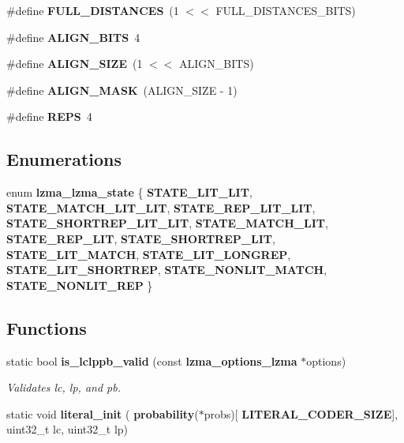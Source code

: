 \begin{DoxyCompactItemize}
\#define {\bfseries F\+U\+L\+L\+\_\+\+D\+I\+S\+T\+A\+N\+C\+ES}~(1 $<$$<$ F\+U\+L\+L\+\_\+\+D\+I\+S\+T\+A\+N\+C\+E\+S\+\_\+\+B\+I\+TS)
\item 
\mbox{\label{lzma__common_8h_a2ae9aed5395d2113810e0c5067064605}} 
\#define {\bfseries A\+L\+I\+G\+N\+\_\+\+B\+I\+TS}~4
\item 
\mbox{\label{lzma__common_8h_a65d1ea18e1cbfa27d9d1952f05e31e60}} 
\#define {\bfseries A\+L\+I\+G\+N\+\_\+\+S\+I\+ZE}~(1 $<$$<$ A\+L\+I\+G\+N\+\_\+\+B\+I\+TS)
\item 
\mbox{\label{lzma__common_8h_a9acfa53ba535d32d76682f5d3e893c05}} 
\#define {\bfseries A\+L\+I\+G\+N\+\_\+\+M\+A\+SK}~(A\+L\+I\+G\+N\+\_\+\+S\+I\+ZE -\/ 1)
\item 
\mbox{\label{lzma__common_8h_a28973becc878febad71571123f7df2c9}} 
\#define {\bfseries R\+E\+PS}~4
\end{DoxyCompactItemize}
\subsection*{Enumerations}
\begin{DoxyCompactItemize}
\item 
enum \textbf{ lzma\+\_\+lzma\+\_\+state} \{ \newline
{\bfseries S\+T\+A\+T\+E\+\_\+\+L\+I\+T\+\_\+\+L\+IT}, 
{\bfseries S\+T\+A\+T\+E\+\_\+\+M\+A\+T\+C\+H\+\_\+\+L\+I\+T\+\_\+\+L\+IT}, 
{\bfseries S\+T\+A\+T\+E\+\_\+\+R\+E\+P\+\_\+\+L\+I\+T\+\_\+\+L\+IT}, 
{\bfseries S\+T\+A\+T\+E\+\_\+\+S\+H\+O\+R\+T\+R\+E\+P\+\_\+\+L\+I\+T\+\_\+\+L\+IT}, 
\newline
{\bfseries S\+T\+A\+T\+E\+\_\+\+M\+A\+T\+C\+H\+\_\+\+L\+IT}, 
{\bfseries S\+T\+A\+T\+E\+\_\+\+R\+E\+P\+\_\+\+L\+IT}, 
{\bfseries S\+T\+A\+T\+E\+\_\+\+S\+H\+O\+R\+T\+R\+E\+P\+\_\+\+L\+IT}, 
{\bfseries S\+T\+A\+T\+E\+\_\+\+L\+I\+T\+\_\+\+M\+A\+T\+CH}, 
\newline
{\bfseries S\+T\+A\+T\+E\+\_\+\+L\+I\+T\+\_\+\+L\+O\+N\+G\+R\+EP}, 
{\bfseries S\+T\+A\+T\+E\+\_\+\+L\+I\+T\+\_\+\+S\+H\+O\+R\+T\+R\+EP}, 
{\bfseries S\+T\+A\+T\+E\+\_\+\+N\+O\+N\+L\+I\+T\+\_\+\+M\+A\+T\+CH}, 
{\bfseries S\+T\+A\+T\+E\+\_\+\+N\+O\+N\+L\+I\+T\+\_\+\+R\+EP}
 \}
\end{DoxyCompactItemize}
\subsection*{Functions}
\begin{DoxyCompactItemize}
\item 
static bool \textbf{ is\+\_\+lclppb\+\_\+valid} (const \textbf{ lzma\+\_\+options\+\_\+lzma} $\ast$options)
\begin{DoxyCompactList}\small\item\em Validates lc, lp, and pb. \end{DoxyCompactList}\item 
\mbox{\label{lzma__common_8h_aa08e52ba6f25a872abac5c7055400412}} 
static void {\bfseries literal\+\_\+init} (\textbf{ probability}($\ast$probs)[\textbf{ L\+I\+T\+E\+R\+A\+L\+\_\+\+C\+O\+D\+E\+R\+\_\+\+S\+I\+ZE}], uint32\+\_\+t lc, uint32\+\_\+t lp)
\end{DoxyCompactItemize}


